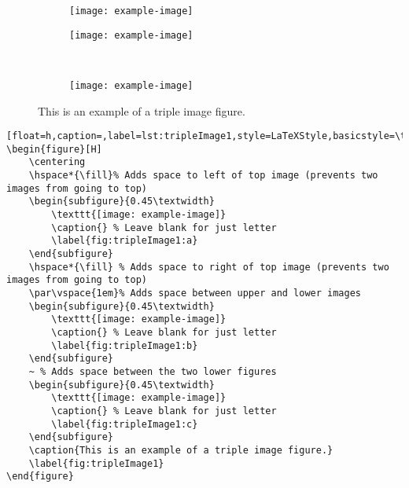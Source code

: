 		\vspace*{\fill}
		\begin{figure}[H]
			\centering
			\hspace*{\fill}%
			\begin{subfigure}{0.45\textwidth}
				\texttt{[image: example-image]}
				\caption{} %
				\label{fig:tripleImage1:a}
			\end{subfigure}
			\hspace*{\fill} %
			\par\vspace{1em}%
			\begin{subfigure}{0.45\textwidth}
				\texttt{[image: example-image]}
				\caption{} %
				\label{fig:tripleImage1:b}
			\end{subfigure}
			~ %
			\begin{subfigure}{0.45\textwidth}
				\texttt{[image: example-image]}
				\caption{} %
				\label{fig:tripleImage1:c}
			\end{subfigure}
			\caption{This is an example of a triple image figure.}
			\label{fig:tripleImage1}
		\end{figure}
		\begin{lstlisting}[float=h,caption=,label=lst:tripleImage1,style=LaTeXStyle,basicstyle=\tiny\ttfamily,]
\begin{figure}[H]
	\centering
	\hspace*{\fill}% Adds space to left of top image (prevents two images from going to top)
	\begin{subfigure}{0.45\textwidth}
		\texttt{[image: example-image]}
		\caption{} % Leave blank for just letter
		\label{fig:tripleImage1:a}
	\end{subfigure}
	\hspace*{\fill} % Adds space to right of top image (prevents two images from going to top)
	\par\vspace{1em}% Adds space between upper and lower images
	\begin{subfigure}{0.45\textwidth}
		\texttt{[image: example-image]}
		\caption{} % Leave blank for just letter
		\label{fig:tripleImage1:b}
	\end{subfigure}
	~ % Adds space between the two lower figures
	\begin{subfigure}{0.45\textwidth}
		\texttt{[image: example-image]}
		\caption{} % Leave blank for just letter
		\label{fig:tripleImage1:c}
	\end{subfigure}
	\caption{This is an example of a triple image figure.}
	\label{fig:tripleImage1}
\end{figure}
		\end{lstlisting}
		\vspace*{\fill}
		\pagebreak



